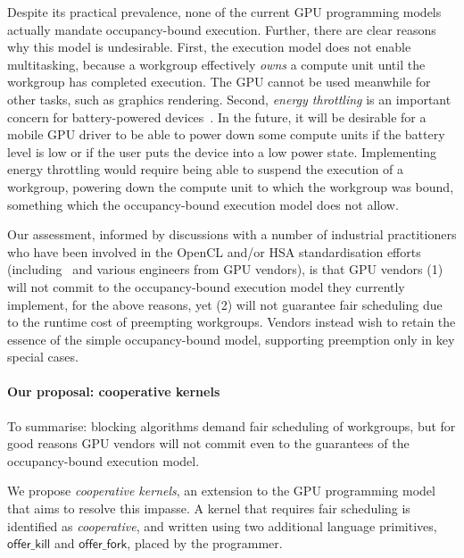 \documentclass[numbers,nocopyrightspace,10pt]{sigplanconf}
\newcommand{\offerfork}{\mathsf{offer\_fork}}
\newcommand{\offerkill}{\mathsf{offer\_kill}}
\begin{document}
Despite its practical prevalence, none of the current GPU programming
models actually mandate occupancy-bound execution.  Further, there are
clear reasons why this model is undesirable.
First, the execution model does not enable
multitasking, because a workgroup effectively \emph{owns} a compute
unit until the workgroup has completed execution.  The GPU cannot be used meanwhile for other
tasks, such as graphics rendering.
Second, \emph{energy throttling} is
an important concern for battery-powered devices~\cite{DBLP:journals/comsur/Vallina-RodriguezC13}.  In the future, it will be desirable for a mobile GPU driver to be able to
power down some compute units if the battery level is low or if
the user puts the device into a low power state.  Implementing energy
throttling would require being able to suspend the execution of a
workgroup, powering down the compute unit to which the workgroup was
bound, something which the occupancy-bound execution model does not allow.

Our assessment, informed by discussions with a number of industrial
practitioners who have been involved in the OpenCL and/or HSA
standardisation efforts
(including~\cite{PersonalCommunicationRichards,PersonalCommunicationHowes}
and various engineers from GPU vendors), is that GPU vendors (1) will
not commit to the occupancy-bound execution model they currently
implement, for the above reasons,
yet (2) will not guarantee fair scheduling due to the
runtime cost of preempting
workgroups.  Vendors instead wish to
retain the essence of the simple occupancy-bound model, supporting preemption
only in key special cases.


\vspace{-1mm}
\paragraph{Our proposal: cooperative kernels}
%
To summarise: blocking algorithms
demand fair scheduling of workgroups, but for good reasons
GPU vendors will not commit even to the guarantees of the
occupancy-bound execution model.

We propose \emph{cooperative kernels}, an extension to the GPU
programming model that aims to resolve this impasse.  A kernel
that requires fair scheduling is identified as \emph{cooperative}, and written using two additional
language primitives, $\offerkill$ and $\offerfork$, placed by the programmer.
\end{document}
